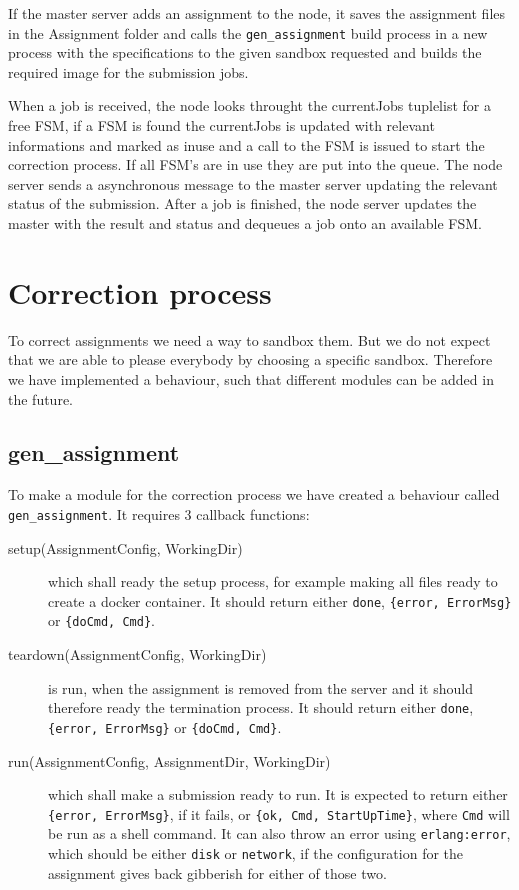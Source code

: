 If the master server adds an assignment to the node, it saves the assignment files in the Assignment folder and calls the \texttt{gen\_assignment} build process in a new process with the specifications to the given sandbox requested and builds the required image for the submission jobs.

When a job is received, the node looks throught the currentJobs tuplelist for a free FSM, if a FSM is found the currentJobs is updated with relevant informations and marked as inuse and a call to the FSM is issued to start the correction process. If all FSM's are in use they are put into the queue. The node server sends a asynchronous message to the master server updating the relevant status of the submission. After a job is finished, the node server updates the master with the result and status and dequeues a job onto an available FSM.

\section{Correction process}
To correct assignments we need a way to sandbox them. But we do not expect that
we are able to please everybody by choosing a specific sandbox. Therefore we
have implemented a behaviour, such that different modules can be added in the
future.

\subsection{gen\_assignment}
To make a module for the correction process we have created a behaviour called
\texttt{gen\_assignment}. It requires 3 callback functions:
\begin{description}
    \item[setup(AssignmentConfig, WorkingDir)] which shall ready the setup
    process, for example making all files ready to create a docker container.
    It should return either \texttt{done}, \texttt{\{error, ErrorMsg\}} or
    \texttt{\{doCmd, Cmd\}}.
    \item[teardown(AssignmentConfig, WorkingDir)] is run, when the assignment is
    removed from the server and it should therefore ready the termination
    process. It should return either \texttt{done}, \texttt{\{error, ErrorMsg\}}
    or \texttt{\{doCmd, Cmd\}}.
    \item[run(AssignmentConfig, AssignmentDir, WorkingDir)] which shall make a
    submission ready to run. It is expected to return either
    \texttt{\{error, ErrorMsg\}}, if it fails, or
    \texttt{\{ok, Cmd, StartUpTime\}}, where \texttt{Cmd} will be run as a shell
    command. It can also throw an error using \texttt{erlang:error}, which
    should be either \texttt{disk} or \texttt{network}, if the configuration for the
    assignment gives back gibberish for either of those two.
\end{description}

